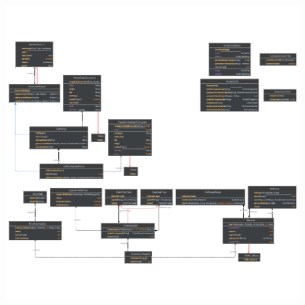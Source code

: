 \begin{figure}[h]
  \centering
  \includegraphics[width=1\linewidth]{figure/classdiagram.pdf}
\end{figure}

